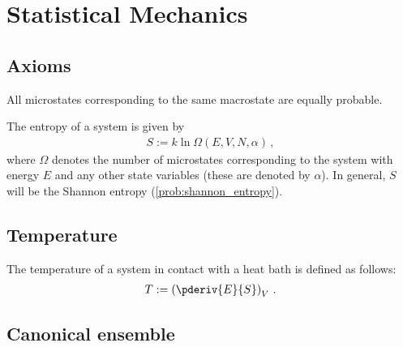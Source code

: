 \chapter{Statistical Mechanics}

\section{Axioms}

    \begin{axiom}
        All microstates corresponding to the same macrostate are equally probable.
    \end{axiom}

    \begin{axiom}\label{statmech:boltzmann_formula}
        The entropy of a system is given by
        \begin{gather}
            S := k\ln\Omega(E,V,N,\alpha)\,,
        \end{gather}
        where $\Omega$ denotes the number of microstates corresponding to the system with energy $E$ and any other state variables (these are denoted by $\alpha$). In general, $S$ will be the Shannon entropy (\cref{prob:shannon_entropy}).
    \end{axiom}

\section{Temperature}

    \begin{definition}\label{statmech:temperature}
        The temperature of a system in contact with a heat bath is defined as follows:
        \begin{gather}
            T := \left(\pderiv{E}{S}\right)_V\,.
        \end{gather}
    \end{definition}

\section{Canonical ensemble}


